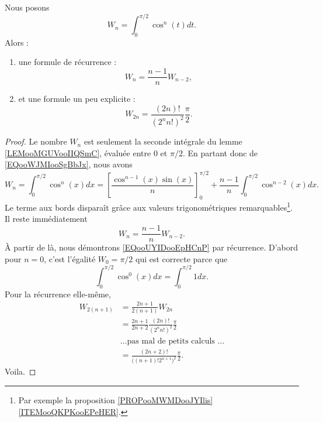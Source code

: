 \begin{lemma}       \label{LEMooUOIBooLyMDft}
    Nous posons
    \begin{equation}
        W_n=\int_0^{\pi/2}\cos^n(t)dt.
    \end{equation}
    Alors :
    \begin{enumerate}
        \item
            une formule de récurrence :
            \begin{equation}        \label{EQooILMZooBUgJpk}
                W_n=\frac{ n-1 }{ n }W_{n-2},
            \end{equation}
        \item et une formule un peu explicite :
            \begin{equation}        \label{EQooUYIDooEpHCnP}
                W_{2n}=\frac{ (2n)! }{ (2^nn!)^2 }\frac{ \pi }{2}.
            \end{equation}
    \end{enumerate}
\end{lemma}

\begin{proof}
    Le nombre \( W_n\) est seulement la seconde intégrale du lemme \ref{LEMooMGUVooIIQSmC}, évaluée entre \( 0\) et \( \pi/2\). En partant donc de \eqref{EQooWJMIooSgBbJx}, nous avons
    \begin{equation}
        W_n=\int_0^{\pi/2}\cos^n(x)dx=\left[ \frac{ \cos^{n-1}(x)\sin(x) }{ n } \right]_0^{\pi/2}+\frac{ n-1 }{ n }\int_0^{\pi/2}\cos^{n-2}(x)dx.
    \end{equation}
    Le terme aux bords disparaît grâce aux valeurs trigonométriques remarquables\footnote{Par exemple la proposition \ref{PROPooMWMDooJYIlis}\ref{ITEMooQKPKooEPeHER}.}. Il reste immédiatement
    \begin{equation}
        W_n=\frac{ n-1 }{ n }W_{n-2}.
    \end{equation}
    À partir de là, nous démontrons \eqref{EQooUYIDooEpHCnP} par récurrence. D'abord pour \( n=0\), c'est l'égalité \( W_0=\pi/2\) qui est correcte parce que
    \begin{equation}
        \int_0^{\pi/2}\cos^0(x)dx=\int_0^{\pi/2}1dx.
    \end{equation}
    Pour la récurrence elle-même,
    \begin{subequations}
        \begin{align}
            W_{2(n+1)}&=\frac{ 2n+1 }{ 2(n+1) }W_{2n}\\
            &=\frac{ 2n+1 }{ 2n+2 }\frac{ (2n)! }{ (2^nn!)^2 }\frac{ \pi }{ 2 }\\
            &\text{\ldots pas mal de petits calculs \ldots}\\
            &=\frac{ (2n+2)! }{ \big( (n+1)!2^{n+1} \big)^2 }\frac{ \pi }{2}.
        \end{align}
    \end{subequations}
    Voila.
\end{proof}

